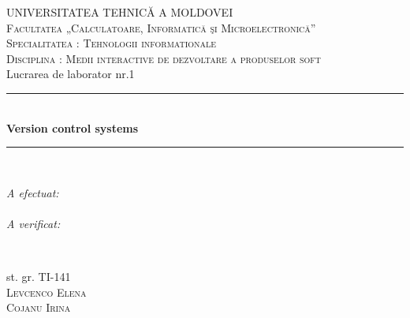\documentclass[12pt]{article}
\begin{document}
\begin{titlepage}

\newcommand{\HRule}{\rule{\linewidth}{0.5mm}} %

\center %
 

\textsc{\Large UNIVERSITATEA TEHNICĂ A MOLDOVEI}\\[1cm] %
\textsc{\Large Facultatea „Calculatoare, Informatică şi Microelectronică”}\\[0.5cm] %
\textsc{\large Specialitatea : Tehnologii informationale}\\[0.5cm] %

\textsc{\large Disciplina : Medii interactive de dezvoltare a produselor soft}\\[1.5cm] %
\large Lucrarea de laborator nr.1\\[1cm]

\HRule \\[0.4cm]
{ \huge \bfseries Version control systems}\\[0.2cm] %
\HRule \\[3cm]
 

\begin{minipage}{0.4\textwidth}
\begin{flushleft} \large
\emph{A efectuat:}\\
\emph{}\\
\emph{A verificat:}\\
\end{flushleft}
\end{minipage}
~
\begin{minipage}{0.4\textwidth}
\begin{flushright} \large
st. gr. TI-141 \\
\textsc{Levcenco Elena}\\ %
\textsc{ Cojanu Irina} %
\end{flushright}
\end{minipage}\\[3cm]


\end{titlepage}
\end{document}
